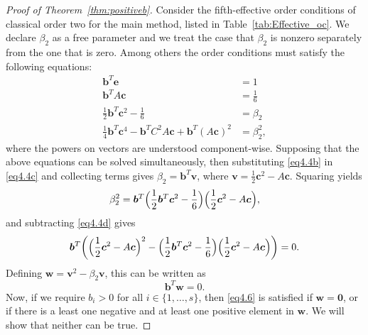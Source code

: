 
\begin{proof}[Proof of Theorem~\ref{thm:positiveb}]
    Consider the fifth-effective order conditions of classical order two for the main method, listed in Table~\ref{tab:Effective_oc}. We declare \( \beta_{2} \) as a free parameter and we treat the case that \( \beta_{2} \) is nonzero separately from the one that is zero. Among others the order conditions must satisfy the following equations:
    \begin{subequations}\label{eq4.4}
        \begin{align}
            \bm{b}^{T}\bm{e} &= 1 \label{eq4.4a} \\
            \bm{b}^{T}A\bm{c} &= \frac{1}{6} \label{eq4.4b} \\
            \frac{1}{2}\bm{b}^{T}\bm{c}^{2} - \frac{1}{6} &= \beta_{2} \label{eq4.4c} \\
            \frac{1}{4}\bm{b}^{T}\bm{c}^{4} - \bm{b}^{T}C^{2}A\bm{c} + \bm{b}^{T}(A\bm{c})^{2} &= \beta_{2}^{2}, \label{eq4.4d}
        \end{align}
    \end{subequations}
    where the powers on vectors are understood component-wise. Supposing that the above equations can be solved simultaneously, then substituting \eqref{eq4.4b} in \eqref{eq4.4c} and collecting terms gives \( \beta_{2} = \bm{b}^{T}\bm{v} \), where \( \bm{v} = \frac{1}{2}\bm{c}^{2} - A\bm{c} \). Squaring yields
    \begin{equation*}%
        \beta_{2}^{2} = \bm{b}^{T}\Bigl(\frac{1}{2}\bm{b}^{T}\bm{c}^{2} - \frac{1}{6}\Bigr)\Bigl(\frac{1}{2}\bm{c}^{2} - A\bm{c}\Bigr),
    \end{equation*}
    and subtracting \eqref{eq4.4d} gives
    \begin{equation*}
        \bm{b}^{T}\biggl(\Bigl(\frac{1}{2}\bm{c}^{2} - A\bm{c}\Bigr)^{2} - \Bigl(\frac{1}{2}\bm{b}^{T}\bm{c}^{2} - \frac{1}{6}\Bigr)\Bigl(\frac{1}{2}\bm{c}^{2} - A\bm{c}\Bigr)\biggr) = 0.
    \end{equation*}
    Defining \( \bm{w} = \bm{v}^{2} - \beta_{2}\bm{v} \), this can be written as
    \begin{equation}\label{eq4.6}
        \bm{b}^{T}\bm{w} = 0.
    \end{equation}
    Now, if we require \( b_{i} > 0 \) for all \( i \in \{1,\dots, s\} \), then \eqref{eq4.6} is satisfied if \( \bm{w} = \bm{0} \),
or if there is a least one negative and at least one positive element in \( \bm{w} \).
We will show that neither can be true.



\end{proof}
